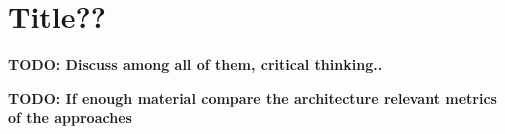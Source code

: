 
    \section{Title??}
    \textbf{TODO: Discuss among all of them, critical thinking..}

    \textbf{TODO: If enough material compare the architecture relevant metrics of the approaches}